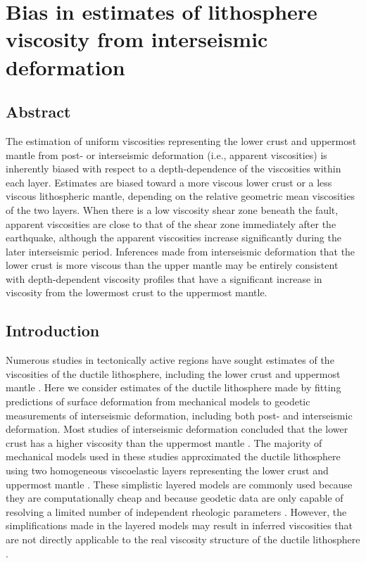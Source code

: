 \chapter{Bias in estimates of lithosphere viscosity from interseismic
deformation}

\section{Abstract}
The estimation of uniform viscosities representing the lower crust and
uppermost mantle from post- or interseismic deformation (i.e.,
apparent viscosities) is inherently biased with respect to a
depth-dependence of the viscosities within each layer. Estimates are
biased toward a more viscous lower crust or a less viscous
lithospheric mantle, depending on the relative geometric mean
viscosities of the two layers. When there is a low viscosity shear
zone beneath the fault, apparent viscosities are close to that of the
shear zone immediately after the earthquake, although the apparent
viscosities increase significantly during the later interseismic
period.  Inferences made from interseismic deformation that the lower
crust is more viscous than the upper mantle may be entirely consistent
with depth-dependent viscosity profiles that have a significant
increase in viscosity from the lowermost crust to the uppermost
mantle.

\section{Introduction}
Numerous studies in tectonically active regions have sought estimates
of the viscosities of the ductile lithosphere, including the lower
crust and uppermost mantle \citep[e.g.,][]{Hetland2003, Pollitz2003,
Pollitz2005, Johnson2007, Hearn2009}. Here we consider estimates of
the ductile lithosphere made by fitting predictions of surface
deformation from mechanical models to geodetic measurements of
interseismic deformation, including both post- and interseismic
deformation.  Most studies of interseismic deformation concluded that
the lower crust has a higher viscosity than the uppermost mantle
\citep{Burgmann2008, Thatcher2008}. The majority of mechanical models
used in these studies approximated the ductile lithosphere using two
homogeneous viscoelastic layers representing the lower crust and
uppermost mantle \citep[e.g.,][]{Hetland2003,Pollitz2003,Hearn2009}.
These simplistic layered models are commonly used because they are
computationally cheap and because geodetic data are only capable of
resolving a limited number of independent rheologic parameters
\citep[e.g.,][]{Riva2009,Pollitz2010}.  However, the simplifications
made in the layered models may result in inferred viscosities that are
not directly applicable to the real viscosity structure of the ductile
lithosphere \citep{Riva2009}.

